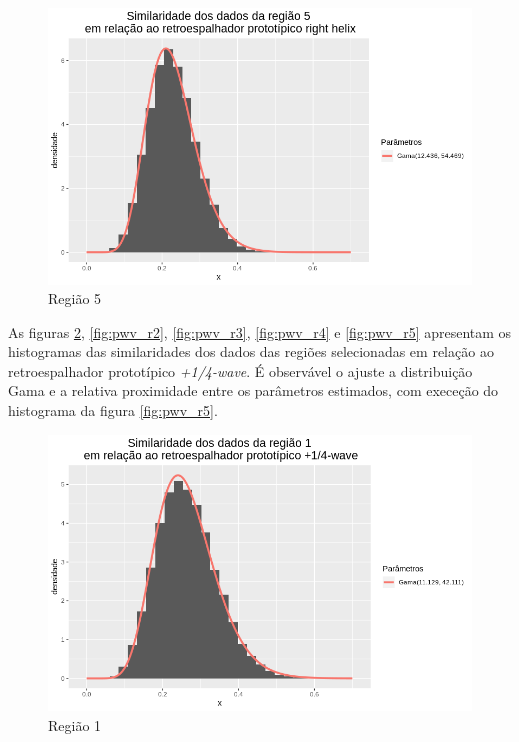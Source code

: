 \documentclass[12pt]{article}
\begin{document}
\begin{figure}[!h]
    \centering
    \includegraphics[width = \linewidth]{../../Images/Report_18_12_20/rh_region5.png}
    \caption{Região 5}
    \label{fig:rh_r5}
\end{figure}

As figuras \ref{fig:pwv_r1}, \ref{fig:pwv_r2}, \ref{fig:pwv_r3}, \ref{fig:pwv_r4} e \ref{fig:pwv_r5} apresentam os histogramas das similaridades dos dados das regiões selecionadas  em relação ao retroespalhador prototípico \textit{+1/4-wave}. É observável o ajuste a distribuição Gama e a relativa proximidade entre os parâmetros estimados, com execeção do histograma da figura \ref{fig:pwv_r5}.

\begin{figure}[!h]
    \centering
    \includegraphics[width = \linewidth]{../../Images/Report_18_12_20/pwv_region1.png}
    \caption{Região 1}
    \label{fig:pwv_r1}
\end{figure}
\end{document}
